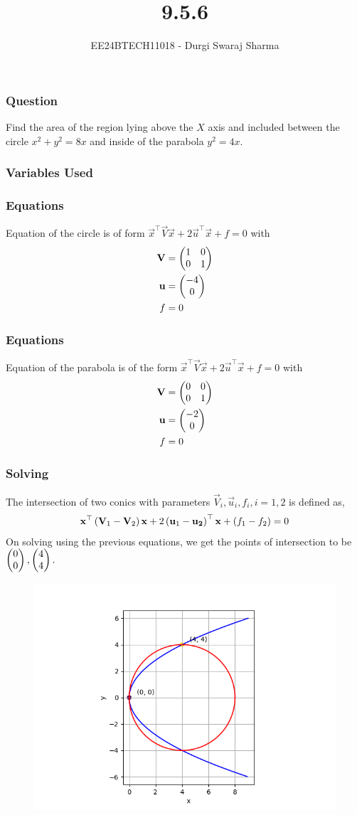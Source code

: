 \documentclass{beamer}
\begin{document}
\title{9.5.6}
\author{EE24BTECH11018 - Durgi Swaraj Sharma}
\date{}
\frame{\titlepage}

\begin{frame}
\frametitle{Question}
Find the area of the region lying above the $X$ axis and included between the circle $x^2+y^2=8x$ and inside of the parabola $y^2=4x$. \hfill {}
\end{frame}

\begin{frame}
\frametitle{Variables Used}
\begin{table}[h!] 
  \centering
  
  \label{tab9-5.6-1}
\end{table}
\end{frame}
\begin{frame}
\frametitle{Equations}
Equation of the circle is of form $\vec{x}^{\top}\vec{V}\vec{x}+2\vec{u}^{\top}\vec{x}+f=0$ with
	\begin{align}
		\mathbf{V}&=\begin{pmatrix}1&0\\0&1\end{pmatrix}\\
		\mathbf{u}&=\begin{pmatrix}-4\\0\end{pmatrix}\\
		f&=0
\end{align}
\end{frame}
\begin{frame}
	\frametitle{Equations}
Equation of the parabola is of the form $\vec{x}^{\top}\vec{V}\vec{x}+2\vec{u}^{\top}\vec{x}+f=0$ with
\begin{align}
	\mathbf{V}&=\begin{pmatrix}0&0\\0&1\end{pmatrix}\\
	\mathbf{u}&=\begin{pmatrix}-2\\0\end{pmatrix}\\
	f&=0
\end{align}
\end{frame}
\begin{frame}
	\frametitle{Solving}
The intersection of two conics with parameters $\vec{V}_i,\vec{u}_i,f_i, i=1,2$ is defined as,
\begin{align}
	\mathbf{x}^{\top}\left(\mathbf{V}_1-\mathbf{V}_2\right)\mathbf{x}+2\left(\mathbf{u}_1-\mathbf{u_2}\right)^{\top}\mathbf{x}+\left(f_1-f_2\right)=0
\end{align} 
On solving using the previous equations, we get the points of intersection to be $\begin{pmatrix}0\\0\end{pmatrix},\begin{pmatrix}4\\4\end{pmatrix}.$
\begin{figure}[h!]
   \centering
   \includegraphics[width = 0.5\linewidth]{figs/fig1.png}
   \label{stemplot}
\end{figure}
\end{frame}
\end{document}
